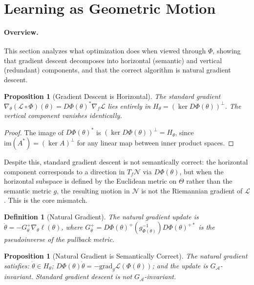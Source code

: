\documentclass[twocolumn,10pt]{article}
\theoremstyle{thmstyle}
\newtheorem{proposition}[theorem]{Proposition}
\theoremstyle{defstyle}
\newtheorem{definition}[theorem]{Definition}
\begin{document}
\section{Learning as Geometric Motion}
\label{sec:learning}

\paragraph{Overview.}
This section analyzes what optimization does when viewed through $\Phi$,
showing that gradient descent decomposes into horizontal (semantic) and
vertical (redundant) components, and that the correct algorithm is
natural gradient descent.

\begin{proposition}[Gradient Descent is Horizontal]
The standard gradient
$\nabla_\theta(\mathcal{L}\circ\Phi)(\theta) =
D\Phi(\theta)^*\nabla_f\mathcal{L}$ lies entirely in
$H_\theta = (\ker D\Phi(\theta))^\perp$.
The vertical component vanishes identically.
\end{proposition}

\begin{proof}
The image of $D\Phi(\theta)^*$ is $(\ker D\Phi(\theta))^\perp = H_\theta$,
since $\mathrm{im}(A^*) = (\ker A)^\perp$ for any linear map between
inner product spaces.
\end{proof}

Despite this, standard gradient descent is not semantically correct:
the horizontal component corresponds to a direction in $T_f\mathcal{N}$
via $D\Phi(\theta)$, but when the horizontal subspace is defined by the
Euclidean metric on $\Theta$ rather than the semantic metric $g$, the
resulting motion in $\mathcal{N}$ is not the Riemannian gradient of
$\mathcal{L}$. This is the core mismatch.

\begin{definition}[Natural Gradient]
The \emph{natural gradient} update is
$\dot\theta = -G_\theta^+\nabla_\theta\ell(\theta)$,
where $G_\theta^+ = D\Phi(\theta)^+(g^{-1}_{\Phi(\theta)})D\Phi(\theta)^{+*}$
is the pseudoinverse of the pullback metric.
\end{definition}

\begin{proposition}[Natural Gradient is Semantically Correct]
The natural gradient satisfies: $\dot\theta \in H_\theta$;
$D\Phi(\theta)\dot\theta = -\mathrm{grad}_g\mathcal{L}(\Phi(\theta))$;
and the update is $G_\mathcal{A}$-invariant. Standard gradient descent
is not $G_\mathcal{A}$-invariant.
\end{proposition}
\end{document}
